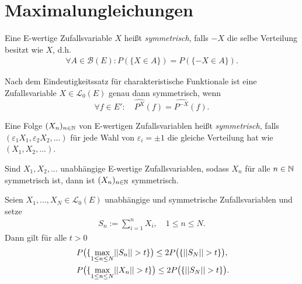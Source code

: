 \section{Maximalungleichungen}

\begin{mydef}
    Eine E-wertige Zufallsvariable $X$ heißt \textit{symmetrisch}, falls $-X$ die selbe Verteilung besitzt wie $X$, d.h.
    \begin{align*}
        \forall A \in \mathcal{B}(E): P(\{X \in A\}) = P(\{-X \in A\}). 
    \end{align*}
\end{mydef}

\begin{remark}
    Nach dem Eindeutigkeitssatz für charakteristische Funktionale ist eine Zufallsvariable $X \in \mathcal{L}_0(E)$ genau dann symmetrisch, wenn 
    $$
        \forall f \in E': \quad \widehat{P^X}(f) = \widehat{P^{-X}}(f). 
    $$
\end{remark}

\begin{mydef}%
    Eine Folge $(X_n)_{n \in \mathbb{N}}$ von E-wertigen Zufallsvariablen heißt \textit{symmetrisch}, 
    falls $(\varepsilon_1 X_1, \varepsilon_2 X_2,...)$ für jede Wahl von $\varepsilon_i = \pm 1$ 
    die gleiche Verteilung hat wie $(X_1,X_2,...)$. 
\end{mydef}

\begin{remark}
   Sind $X_1,X_2,...$ unabhängige E-wertige Zufallsvariablen, sodass $X_n$ für alle $n \in \mathbb{N}$ symmetrisch ist, dann ist $(X_n)_{n \in \mathbb{N}}$ symmetrisch. 
\end{remark}

\begin{theorem}
    Seien $X_1,...,X_N \in \mathcal{L}_0(E)$ unabhängige und symmetrische Zufallsvariablen und setze 
    \begin{align*}
        S_n := \sum_{i=1}^n X_i, \quad 1 \leq n \leq N. 
    \end{align*}
    Dann gilt für alle $t > 0$
    \begin{align}
        &P\big(\{ \max_{1 \leq n \leq N} \lvert\lvert S_n \rvert\rvert > t \}\big) \leq 2 P\big(\{\lvert\lvert S_N \rvert\rvert > t \}\big), \\\
        &P\big(\{ \max_{1 \leq n \leq N} \lvert\lvert X_n \rvert\rvert > t \}\big) \leq 2 P\big(\{\lvert\lvert S_N \rvert\rvert > t \}\big).
    \end{align}
\end{theorem}

